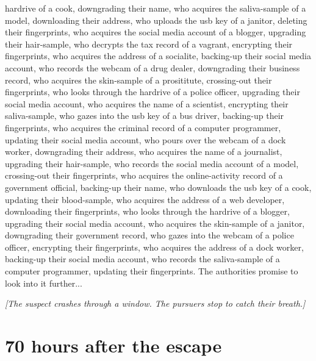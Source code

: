 \documentclass{report}
\begin{document}
hardrive of a cook, downgrading their name, who acquires the saliva-sample of a model, downloading their address, who uploads the usb key of a janitor, deleting their fingerprints, who acquires the social media account of a blogger, upgrading their hair-sample, who decrypts the tax record of a vagrant, encrypting their fingerprints, who acquires the address of a socialite, backing-up their social media account, who records the webcam of a drug dealer, downgrading their business record, who acquires the skin-sample of a prosititute, crossing-out their fingerprints, who looks through the hardrive of a police officer, upgrading their social media account, who acquires the name of a scientist, encrypting their saliva-sample, who gazes into the usb key of a bus driver, backing-up their fingerprints, who acquires the criminal record of a computer programmer, updating their social media account, who pours over the webcam of a dock worker, downgrading their address, who acquires the name of a journalist, upgrading their hair-sample, who records the social media account of a model, crossing-out their fingerprints, who acquires the online-activity record of a government official, backing-up their name, who downloads the usb key of a cook, updating their blood-sample, who acquires the address of a web developer, downloading their fingerprints, who looks through the hardrive of a blogger, upgrading their social media account, who acquires the skin-sample of a janitor, downgrading their government record, who gazes into the webcam of a police officer, encrypting their fingerprints, who acquires the address of a dock worker, backing-up their social media account, who records the saliva-sample of a computer programmer, updating their fingerprints. The authorities promise to look into it further...

\textit{[The suspect crashes through a window. The pursuers stop to catch their breath.]}


\section*{70 \small{hours after the escape}}
\end{document}
